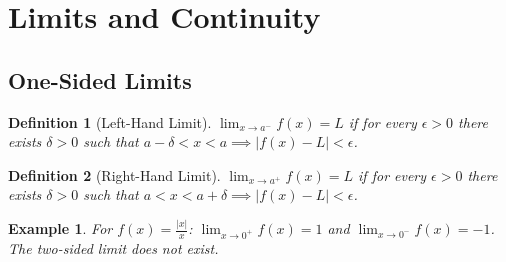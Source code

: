 \documentclass[11pt,a4paper]{article}
\newtheorem{example}{Example}
\newtheorem{definition}{Definition}
\begin{document}
\section{Limits and Continuity}
\subsection{One-Sided Limits}
\begin{definition}[Left-Hand Limit]
$\lim_{x \to a^-} f(x) = L$ if for every $\epsilon > 0$ there exists $\delta > 0$ such that $a - \delta < x < a \implies |f(x) - L| < \epsilon$.
\end{definition}
\begin{definition}[Right-Hand Limit]
$\lim_{x \to a^+} f(x) = L$ if for every $\epsilon > 0$ there exists $\delta > 0$ such that $a < x < a + \delta \implies |f(x) - L| < \epsilon$.
\end{definition}
\begin{example}
For $f(x) = \frac{|x|}{x}$: $\lim_{x \to 0^+} f(x) = 1$ and $\lim_{x \to 0^-} f(x) = -1$. The two-sided limit does not exist.
\end{example}
\end{document}
